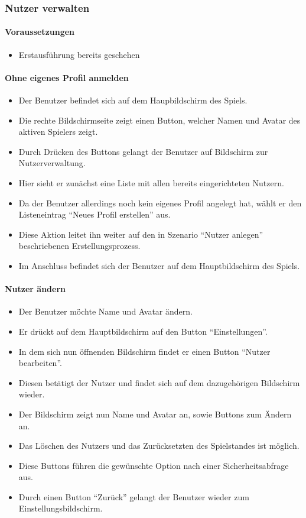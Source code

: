 \subsubsection{Nutzer verwalten}
\paragraph{Voraussetzungen}
\begin{itemize}
\item Erstausführung bereits geschehen
\end{itemize}

\paragraph{Ohne eigenes Profil anmelden}
\begin{itemize}
\item Der Benutzer befindet sich auf dem Haupbildschirm des Spiels.
\item Die rechte Bildschirmseite zeigt einen Button, welcher Namen und Avatar des aktiven Spielers zeigt.
\item Durch Drücken des Buttons gelangt der Benutzer auf Bildschirm zur Nutzerverwaltung.
\item Hier sieht er zunächst eine Liste mit allen bereits 
eingerichteten Nutzern.
\item Da der Benutzer allerdings noch kein eigenes Profil
angelegt hat, wählt er den Listeneintrag "`Neues Profil erstellen"' aus.
\item Diese Aktion leitet ihn weiter auf den in Szenario "`Nutzer anlegen"'
beschriebenen Erstellungsprozess.
\item Im Anschluss befindet sich der Benutzer auf dem Hauptbildschirm des Spiels.
\end{itemize}

\paragraph{Nutzer ändern}
\begin{itemize}
\item Der Benutzer möchte Name und Avatar ändern.
\item Er drückt auf dem Hauptbildschirm auf den Button "`Einstellungen"'.
\item In dem sich nun öffnenden Bildschirm findet er einen Button "`Nutzer bearbeiten"'.
\item Diesen betätigt der Nutzer und findet sich auf dem dazugehörigen
Bildschirm wieder. 
\item Der Bildschirm zeigt nun Name und Avatar an, sowie Buttons zum Ändern an.
\item Das Löschen des Nutzers und das Zurücksetzten des Spielstandes ist möglich. 
\item Diese Buttons führen die gewünschte Option nach einer Sicherheitsabfrage aus.
\item Durch einen Button "`Zurück"' gelangt der Benutzer wieder zum Einstellungsbildschirm.
\end{itemize}
